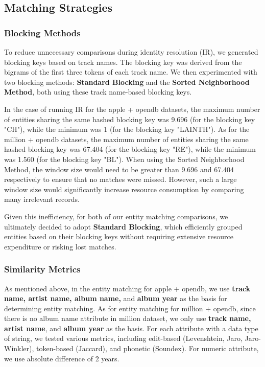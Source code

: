 \documentclass[runningheads]{llncs}
\begin{document}
\subsection{Matching Strategies}
\subsubsection{Blocking Methods}

To reduce unnecessary comparisons during identity resolution (IR), we generated blocking keys based on track names. The blocking key was derived from the bigrams of the first three tokens of each track name. We then experimented with two blocking methods: \textbf{Standard Blocking} and the \textbf{Sorted Neighborhood Method}, both using these track name-based blocking keys.

In the case of running IR for the apple + opendb datasets, the maximum number of entities sharing the same hashed blocking key was 9.696 (for the blocking key "CH"), while the minimum was 1 (for the blocking key "LAINTH"). As for the million + opendb datasets, the maximum number of entities sharing the same hashed blocking key was 67.404 (for the blocking key "RE"), while the minimum was 1.560 (for the blocking key "BL"). When using the Sorted Neighborhood Method, the window size would need to be greater than 9.696 and 67.404 respectively to ensure that no matches were missed. However, such a large window size would significantly increase resource consumption by comparing many irrelevant records.

Given this inefficiency, for both of our entity matching comparisons, we ultimately decided to adopt \textbf{Standard Blocking}, which efficiently grouped entities based on their blocking keys without requiring extensive resource expenditure or risking lost matches.
\subsubsection{Similarity Metrics}
As mentioned above, in the entity matching for apple + opendb, we use \textbf{track name, artist name, album name, }and \textbf{album year} as the basis for determining entity matching. As for entity matching for million + opendb, since there is no album name attribute in million dataset, we only use \textbf{track name, artist name}, and \textbf{album year} as the basis. For each attribute with a data type of string, we tested various metrics, including edit-based (Levenshtein, Jaro, Jaro-Winkler), token-based (Jaccard), and phonetic (Soundex). For numeric attribute, we use absolute difference of 2 years.
\end{document}
